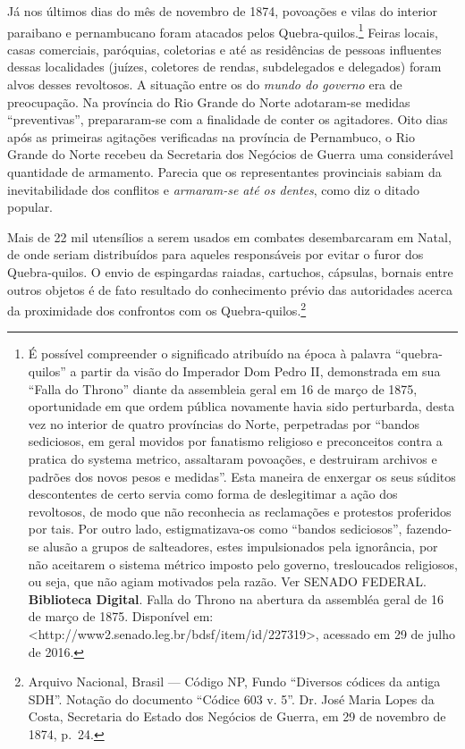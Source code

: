 \begin{refsection}
Já nos últimos dias do mês de novembro de 1874, povoações e vilas do interior paraibano e pernambucano foram atacados pelos Quebra-quilos.\footnote{É possível compreender o significado atribuído na época à palavra “quebra-quilos” a partir da visão do Imperador Dom Pedro II, demonstrada em sua “Falla do Throno” diante da assembleia geral em 16 de março de 1875, oportunidade em que ordem pública novamente havia sido perturbarda, desta vez no interior de quatro províncias do Norte, perpetradas por “bandos sediciosos, em geral movidos por fanatismo religioso e preconceitos contra a pratica do systema metrico, assaltaram povoações, e destruiram archivos e padrões dos novos pesos e medidas”. Esta maneira de enxergar os seus súditos descontentes de certo servia como forma de deslegitimar a ação dos revoltosos, de modo que não reconhecia as reclamações e protestos proferidos por tais. Por outro lado, estigmatizava-os como “bandos sediciosos”, fazendo-se alusão a grupos de salteadores, estes impulsionados pela ignorância, por não aceitarem o sistema métrico imposto pelo governo, tresloucados religiosos, ou seja, que não agiam motivados pela razão. Ver SENADO FEDERAL. \textbf{Biblioteca Digital}. Falla do Throno na abertura da assembléa geral de 16 de março de 1875. Disponível em: <http://www2.senado.leg.br/bdsf/item/id/227319>, acessado em 29 de julho de 2016.} Feiras locais, casas comerciais, paróquias, coletorias e até as residências de pessoas influentes dessas localidades (juízes, coletores de rendas, subdelegados e delegados) foram alvos desses revoltosos. A situação entre os do \textit{mundo do governo} era de preocupação. Na província do Rio Grande do Norte adotaram-se medidas “preventivas”, prepararam-se com a finalidade de conter os agitadores. Oito dias após as primeiras agitações verificadas na província de Pernambuco, o Rio Grande do Norte recebeu da Secretaria dos Negócios de Guerra uma considerável quantidade de armamento. Parecia que os representantes provinciais sabiam da inevitabilidade dos conflitos e \textit{armaram-se até os dentes}, como diz o ditado popular. 

Mais de 22 mil utensílios a serem usados em combates desembarcaram em Natal, de onde seriam distribuídos para aqueles responsáveis por evitar o furor dos Quebra-quilos. O envio de espingardas raiadas, cartuchos, cápsulas, bornais entre outros objetos é de fato resultado do conhecimento prévio das autoridades acerca da proximidade dos confrontos com os Quebra-quilos.\footnote{Arquivo Nacional, Brasil --- Código NP, Fundo ``Diversos códices da antiga SDH''. Notação do documento “Códice 603 v. 5”. Dr. José Maria Lopes da Costa, Secretaria do Estado dos Negócios de Guerra, em 29 de novembro de 1874, p.~24.}


\end{refsection}
